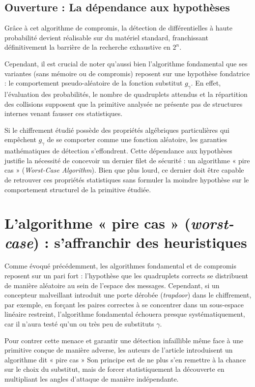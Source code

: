 \documentclass[a4paper,11pt]{article}
\begin{document}
\subsection{Ouverture : La dépendance aux hypothèses}

Grâce à cet algorithme de compromis, la détection de différentielles à haute probabilité devient réalisable sur du matériel standard, franchissant définitivement la barrière de la recherche exhaustive en $2^n$. 

Cependant, il est crucial de noter qu'aussi bien l'algorithme fondamental que ses variantes (sans mémoire ou de compromis) reposent sur une hypothèse fondatrice : le comportement pseudo-aléatoire de la fonction substitut $g_{\gamma}$. En effet, l'évaluation des probabilités, le nombre de quadruplets attendus et la répartition des collisions supposent que la primitive analysée ne présente pas de structures internes venant fausser ces statistiques.

Si le chiffrement étudié possède des propriétés algébriques particulières qui empêchent $g_{\gamma}$ de se comporter comme une fonction aléatoire, les garanties mathématiques de détection s'effondrent. Cette dépendance aux hypothèses justifie la nécessité de concevoir un dernier filet de sécurité : un algorithme « pire cas » (\textit{Worst-Case Algorithm}). Bien que plus lourd, ce dernier doit être capable de retrouver ces propriétés statistiques sans formuler la moindre hypothèse sur le comportement structurel de la primitive étudiée.

\section{L'algorithme « pire cas » (\textit{worst-case}) : s'affranchir des heuristiques}

Comme évoqué précédemment, les algorithmes fondamental et de compromis reposent sur un pari fort : l'hypothèse que les quadruplets corrects se distribuent de manière aléatoire au sein de l'espace des messages. Cependant, si un concepteur malveillant introduit une porte dérobée (\textit{trapdoor}) dans le chiffrement, par exemple, en forçant les paires correctes à se concentrer dans un sous-espace linéaire restreint, l'algorithme fondamental échouera presque systématiquement, car il n'aura testé qu'un ou très peu de substituts $\gamma$. 

Pour contrer cette menace et garantir une détection infaillible même face à une primitive conçue de manière adverse, les auteurs de l'article introduisent un algorithme dit « pire cas » Son principe est de ne plus s'en remettre à la chance sur le choix du substitut, mais de forcer statistiquement la découverte en multipliant les angles d'attaque de manière indépendante.
\end{document}
